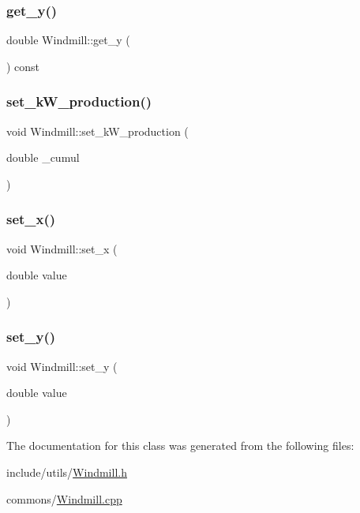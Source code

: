 \mbox{\label{class_windmill_a530a5389da11b72da1a5f519ff62d4e5}} 
\subsubsection{\texorpdfstring{get\_y()}{get\_y()}}
{\footnotesize\ttfamily double Windmill\+::get\+\_\+y (\begin{DoxyParamCaption}{ }\end{DoxyParamCaption}) const}

\mbox{\label{class_windmill_a5c4a7f5a3a66db3bd1f27448d215bc7b}} 
\subsubsection{\texorpdfstring{set\_kW\_production()}{set\_kW\_production()}}
{\footnotesize\ttfamily void Windmill\+::set\+\_\+k\+W\+\_\+production (\begin{DoxyParamCaption}\item[{double}]{\+\_\+cumul }\end{DoxyParamCaption})}

\mbox{\label{class_windmill_aa30d16b7d9666e00dad2a13b6d8bda58}} 
\subsubsection{\texorpdfstring{set\_x()}{set\_x()}}
{\footnotesize\ttfamily void Windmill\+::set\+\_\+x (\begin{DoxyParamCaption}\item[{double}]{value }\end{DoxyParamCaption})}

\mbox{\label{class_windmill_ab669b5a24920634578d95c6d4b967cf9}} 
\subsubsection{\texorpdfstring{set\_y()}{set\_y()}}
{\footnotesize\ttfamily void Windmill\+::set\+\_\+y (\begin{DoxyParamCaption}\item[{double}]{value }\end{DoxyParamCaption})}



The documentation for this class was generated from the following files\+:\begin{DoxyCompactItemize}
\item 
include/utils/\mbox{\hyperlink{utils_2_windmill_8h}{Windmill.\+h}}\item 
commons/\mbox{\hyperlink{commons_2_windmill_8cpp}{Windmill.\+cpp}}\end{DoxyCompactItemize}
